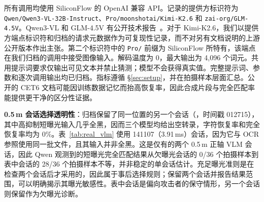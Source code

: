 \documentclass{ieeeaccess}
\begin{document}
所有调用均使用 SiliconFlow 的 OpenAI 兼容 API。记录的提供方标识符为 \texttt{Qwen/\allowbreak Qwen3-\allowbreak VL-\allowbreak 32B-\allowbreak Instruct}、\texttt{Pro/\allowbreak moonshotai/\allowbreak Kimi-\allowbreak K2.6} 和 \texttt{zai-\allowbreak org/\allowbreak GLM-\allowbreak 4.5V}。Qwen3-VL 和 GLM-4.5V 有公开技术报告~\cite{b_qwen3vl2025,b_glm45v2025}。对于 Kimi-K2.6，我们以提供方端点标识符和归档的请求元数据作为可复现性记录，而不对另有文档说明的上游公开版本作出主张。第二个标识符中的 \texttt{Pro/} 前缀为 SiliconFlow 所特有，该端点在我们归档的调用中接受图像输入。解码温度为 0，最大输出为 4,096 个词元。共用提示词要求仅输出可见文本并禁止猜测；模型不会获得真实值。完整提示词、参数和逐次调用输出均已归档。指标遵循 \S\ref{sec:setup}，并在拍摄样本层面汇总。公开的 CET6 文档可能因训练数据记忆而抬高恢复率，因此合成片段与完全匹配率能提供更干净的区分性证据。

\textbf{0.5\,m 会话选择透明性}：归档保留了同一位置的另一个会话（，时间戳 012715），其中高抑制短曝光输入几乎全黑，因而三个模型均给出空转录，字符恢复率和完全恢复率均为 0\%。表~\ref{tab:real_vlm} 使用 141107（3.91\,ms）会话，因为它与 OCR 参照使用同一批文件，且其输入并非全黑。这是仅有的两个 0.5\,m 正轴 VLM 会话，因此 Qwen 观测到的短曝光完全匹配结果从欠曝光会话的 0/36 个拍摄样本到表中会话的 28/36 个拍摄样本不等，并非稳定的单会话估计。充足曝光准则是在检查两个会话后才采用的，因此属于事后选择规则；保留两个会话并报告结果范围，可以明确揭示其曝光敏感性。表中会话是偏向攻击者的保守情形，另一个会话则保留作为欠曝光诊断。
\end{document}
